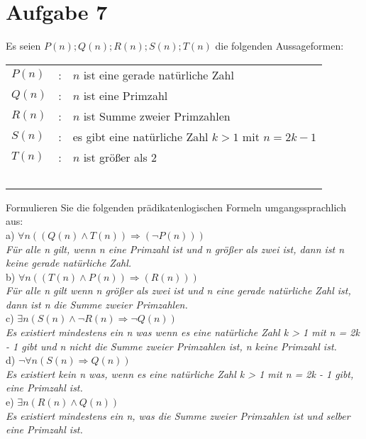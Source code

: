 \section*{Aufgabe 7}

Es seien $P(n); Q(n); R(n); S(n); T(n)$ die folgenden Aussageformen:\\

\begin{tabular}{lcl}
$P(n)$ & : & $n$ ist eine gerade natürliche Zahl\\
$Q(n)$ & : & $n$ ist eine Primzahl\\
$R(n)$ & : & $n$ ist Summe zweier Primzahlen\\
$S(n)$ & : & es gibt eine natürliche Zahl $k > 1$ mit $n = 2k - 1$\\
$T(n)$ & : & $n$ ist größer als $2$\\~\\
\end{tabular}

Formulieren Sie die folgenden prädikatenlogischen Formeln umgangssprachlich aus:\\

a) $\forall n ((Q(n) \land T(n)) \Rightarrow (\lnot P(n)))$\\

\textit{Für alle n gilt, wenn n eine Primzahl ist und n größer als zwei ist, dann ist n keine gerade natürliche Zahl.}\\

b) $\forall n ((T(n) \land P(n)) \Rightarrow (R(n)))$\\

\textit{Für alle n gilt wenn n größer als zwei ist und n eine gerade natürliche Zahl ist, dann ist n die Summe zweier Primzahlen.}\\

c) $\exists n (S(n) \land \lnot R(n) \Rightarrow \lnot Q(n))$\\

\textit{Es existiert mindestens ein n was wenn es eine natürliche Zahl k > 1 mit n = 2k - 1 gibt und n nicht die Summe zweier Primzahlen ist, n keine Primzahl ist.}\\

d) $\lnot \forall n (S(n) \Rightarrow Q(n))$\\

\textit{Es existiert kein n was, wenn es eine natürliche Zahl k > 1 mit n = 2k - 1 gibt, eine Primzahl ist.}\\

e) $\exists n (R(n) \land Q(n))$\\

\textit{Es existiert mindestens ein n, was die Summe zweier Primzahlen ist und selber eine Primzahl ist.}